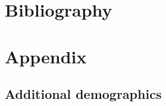 \documentclass[a4paper]{article}
\begin{document}












\section{Bibliography}






\section{Appendix}
\subsection{Additional demographics}
\end{document}
